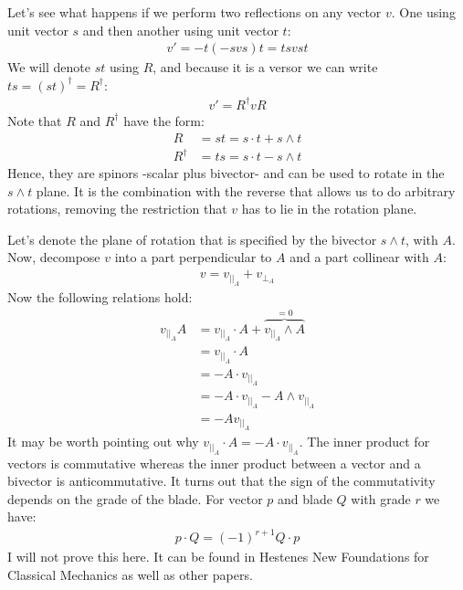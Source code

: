 \documentclass[10pt]{report}
\begin{document}
Let's see what happens if we perform two reflections on any vector
$v$. One using unit vector $s$ and then another using unit vector
$t$:
\begin{align*}
    v' = -t(-svs)t = tsvst
\end{align*}
We will denote $st$ using $R$, and because it is a versor we can
write $ts = (st)^\dagger = R^\dagger$:
\begin{align*}
    v' = R^\dagger v R
\end{align*}
Note that $R$ and $R^\dagger$ have the form:
\begin{align*}
    R         &= st = s\cdot t + s\wedge t \\
    R^\dagger &= ts = s\cdot t - s\wedge t
\end{align*}
Hence, they are spinors -scalar plus bivector- and can be used to
rotate in the $s\wedge t$ plane. It is the combination with the
reverse that allows us to do arbitrary rotations, removing the
restriction that $v$ has to lie in the rotation plane.

Let's denote the plane of rotation that is specified by the
bivector $s\wedge t$, with $A$. Now, decompose $v$ into a part
perpendicular to $A$ and a part collinear with $A$:
\begin{align*}
    v = v_{||_A} + v_{\bot_A}
\end{align*}
Now the following relations hold:
\begin{align*}
    v_{||_A}A &= v_{||_A}\cdot A + \overbrace{v_{||_A}\wedge A}^{= 0}   \\
              &= v_{||_A}\cdot A                                        \\
              &= -A\cdot v_{||_A}                                        \\
              &= -A\cdot v_{||_A} - A\wedge v_{||_A}                     \\
              &= -Av_{||_A}
\end{align*}
It may be worth pointing out why $v_{||_A}\cdot A = -A\cdot
v_{||_A}$. The inner product for vectors is commutative whereas
the inner product between a vector and a bivector is
anticommutative. It turns out that the sign of the commutativity
depends on the grade of the blade. For vector $p$ and blade $Q$
with grade $r$ we have:
\begin{align*}
    p\cdot Q = (-1)^{r+1}Q\cdot p
\end{align*}
I will not prove this here. It can be found in Hestenes New
Foundations for Classical Mechanics \cite{bib:hestenes new
foundations} as well as other papers.
\end{document}

